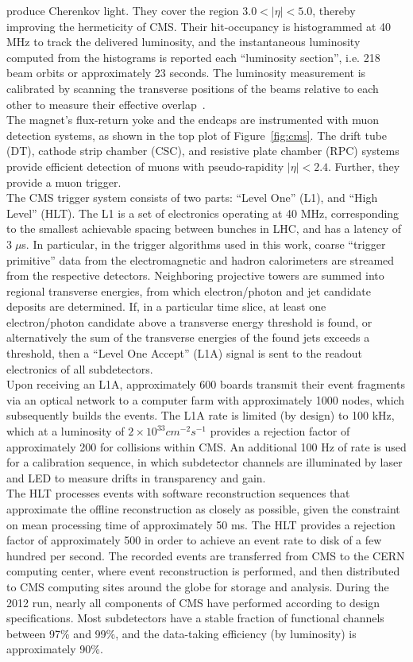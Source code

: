 produce Cherenkov light. They cover the region $3.0 < |\eta| < 5.0$, thereby improving the 
hermeticity of CMS. Their hit-occupancy is histogrammed at 40 MHz to track the delivered
luminosity, and the instantaneous luminosity computed from the histograms is reported each
``luminosity section'', i.e. 218 beam orbits or approximately 23 seconds. The luminosity 
measurement is calibrated by scanning the transverse positions of the beams relative to each 
other to measure their effective overlap~\cite{CMS-PAS-SMP-12-008}.\\ 
\indent The magnet’s flux-return yoke and the endcaps are instrumented with muon detection systems, 
as shown in the top plot of Figure~\ref{fig:cms}. The drift tube (DT), cathode strip chamber 
(CSC), and resistive plate chamber (RPC) systems provide
efficient detection of muons with pseudo-rapidity $|\eta| < 2.4$. Further, they provide a
muon trigger. \\
\indent The CMS trigger system consists of two parts: ``Level One'' (L1), and ``High
Level'' (HLT). The L1 is a set of electronics operating at 40 MHz, corresponding to
the smallest achievable spacing between bunches in LHC, and has a latency of $3\; \mu$s. In
particular, in the trigger algorithms used in this work, coarse ``trigger primitive'' data
from the electromagnetic and hadron calorimeters are streamed from the respective
detectors. Neighboring projective towers are summed into regional transverse energies, 
from which electron/photon and jet candidate deposits are determined. If, in
a particular time slice, at least one electron/photon candidate above a transverse
energy threshold is found, or alternatively the sum of the transverse energies of the
found jets exceeds a threshold, then a ``Level One Accept'' (L1A) signal is sent to the
readout electronics of all subdetectors. \\
\indent Upon receiving an L1A, approximately 600 boards 
transmit their event fragments via an optical network to a computer farm with approximately 
1000 nodes, which subsequently builds the events. The L1A rate is limited (by design) to 100 kHz, 
which at a luminosity of $2 \times 10^{33} cm^{-2} s^{-1}$ provides a rejection factor of approximately 200 for
collisions within CMS. An additional 100 Hz of rate is used for a calibration sequence,
in which subdetector channels are illuminated by laser and LED to measure drifts in
transparency and gain. \\
\indent The HLT processes events with software reconstruction sequences that approximate 
the offline reconstruction as closely as possible, given the constraint on mean
processing time of approximately 50 ms. The HLT provides a rejection factor of
approximately 500 in order to achieve an event rate to disk of a few hundred per 
second. The recorded events are transferred from CMS to the CERN computing center,
where event reconstruction is performed, and then distributed to CMS computing
sites around the globe for storage and analysis. During the 2012 run, nearly all 
components of CMS have performed according to design specifications. Most subdetectors 
have a stable fraction of functional channels between 97\% and 99\%, and the data-taking 
efficiency (by luminosity) is approximately 90\%.


